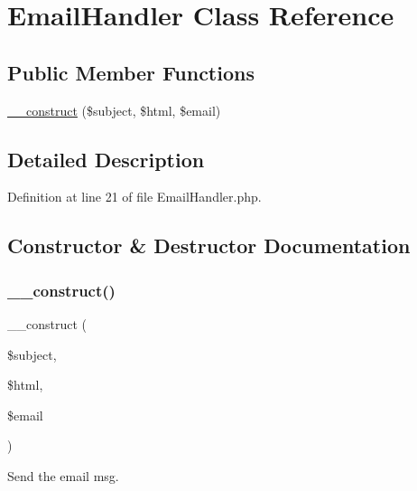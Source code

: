 \hypertarget{class_zest_1_1_auth_1_1_email_handler}{}\section{Email\+Handler Class Reference}
\label{class_zest_1_1_auth_1_1_email_handler}
\subsection*{Public Member Functions}
\begin{DoxyCompactItemize}
\item 
\mbox{\hyperlink{class_zest_1_1_auth_1_1_email_handler_affb38b8a9b4c1b0ef0191322e174f4d8}{\+\_\+\+\_\+construct}} (\$subject, \$html, \$email)
\end{DoxyCompactItemize}


\subsection{Detailed Description}


Definition at line 21 of file Email\+Handler.\+php.



\subsection{Constructor \& Destructor Documentation}
\mbox{\label{class_zest_1_1_auth_1_1_email_handler_affb38b8a9b4c1b0ef0191322e174f4d8}} 
\subsubsection{\texorpdfstring{\+\_\+\+\_\+construct()}{\_\_construct()}}
{\footnotesize\ttfamily \+\_\+\+\_\+construct (\begin{DoxyParamCaption}\item[{}]{\$subject,  }\item[{}]{\$html,  }\item[{}]{\$email }\end{DoxyParamCaption})}

Send the email msg.


